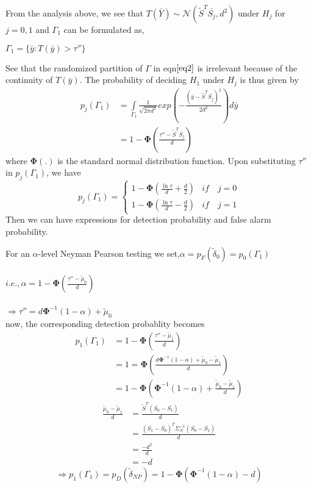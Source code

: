 \documentclass[12pt]{report}
\begin{document}
 From the analysis above, we see that $T(\bar{Y})\sim\mathcal{N}(\tilde{S}^T\bar{S_j},d^2)$ under $H_j$ for $j=0,1$ and $ {\Gamma }_{1} $ can be formulated as,
\begin{center}
$ {\Gamma }_{1}= \lbrace \bar{y} : T(\bar{y})>\tau''\rbrace $
\end{center}
See that the randomized partition of $\Gamma$ in eqn$\eqref{eq2}$ is irrelevant because of the continuity of $T(\bar{y})$. The probability of deciding $H_1$ under $H_j$ is thus given by 
\begin{align*}
p_j(\Gamma_1)&=\underset{\Gamma_1 }{\int }\frac{1}{\sqrt{2\pi {d}^{2}}}{exp(-\frac{(\bar{y}-\tilde{S}^T\bar{S_j})^2}{2d^2})}d\bar{y}\\ &=1-\mathbf{\Phi}(\frac{\tau''-\tilde{S}^T\bar{S_j}}{d})
\end{align*}
where $\mathbf{\Phi}(.)$ is the standard normal distribution function.
Upon substituting $\tau''$ in $p_j(\Gamma_1)$, we have
\[ p_j(\Gamma_1)=
\begin{cases}
1-\mathbf{\Phi}(\frac{\ln\tau}{d}+\frac{d}{2}) &if\quad j=0 \\
1-\mathbf{\Phi}(\frac{\ln\tau}{d}-\frac{d}{2}) &if\quad j=1
\end{cases} \]
Then we can have expressions for detection probability and false alarm probability. 
\begin{exmp}For an $\alpha$-level Neyman Pearson testing we set,$\alpha=p_F(\tilde{\delta}_0)=p_0(\Gamma_1)$\\ \\ \indent \indent
$i.e.,\alpha=1-\mathbf{\Phi}(\frac{\tau''-\tilde{\mu}_0}{d})$\\ \\ \indent \indent $\Rightarrow\tau''=d\mathbf{\Phi}^{-1}(1-\alpha)+\tilde{\mu}_0$ \\now, the corresponding detection probablity becomes
\begin{align*}
p_1(\Gamma_1)&=1-\mathbf{\Phi}(\frac{\tau''-\tilde{\mu}_1}{d})\\ &=1=\mathbf{\Phi}(\frac{d\mathbf{\Phi}^{-1}(1-\alpha)+\tilde{\mu}_0-\tilde{\mu}_1}{d})\\&=1-\mathbf{\Phi}(\mathbf{\Phi}^{-1}(1-\alpha)+\frac{\tilde{\mu}_0-\tilde{\mu}_1}{d})
\end{align*}
\begin{align*}
\frac{\tilde{\mu}_0-\tilde{\mu}_1}{d}&=\frac{\tilde{S}^T(\bar{S_0}-\bar{S_1})}{d}\\&=\frac{(\bar{S_1}-\bar{S_0})^T\varSigma_N^{-1}(\bar{S_0}-\bar{S_1})}{d}\\&=\frac{-d^2}{d}\\&=-d
\end{align*}
\[\Rightarrow p_1(\Gamma_1)=p_D(\tilde{\delta}_{NP})=1-\mathbf{\Phi}(\mathbf{\Phi}^{-1}(1-\alpha)-d)\]\end{exmp}
\end{document}
